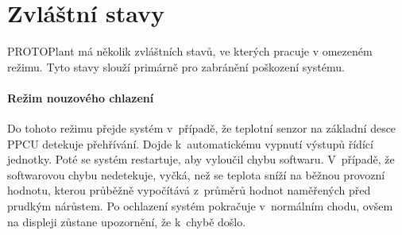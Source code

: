 \section{Zvláštní stavy}
PROTOPlant má několik zvláštních stavů, ve kterých pracuje v omezeném režimu.
Tyto stavy slouží primárně pro zabránění poškození systému.

\paragraph{Režim nouzového chlazení}
\label{paragraph:CoolingMode}
Do tohoto režimu přejde systém v~případě, že teplotní senzor na základní desce PPCU detekuje přehřívání. 
Dojde k~automatickému vypnutí výstupů řídící jednotky.
Poté se systém restartuje, aby vyloučil chybu softwaru.
V~případě, že softwarovou chybu nedetekuje, vyčká, než se teplota sníží na běžnou provozní hodnotu, kterou průběžně vypočítává z~průměrů hodnot naměřených před prudkým nárůstem.
Po ochlazení systém pokračuje v~normálním chodu, ovšem na displeji zůstane upozornění, že k~chybě došlo.

\newpage